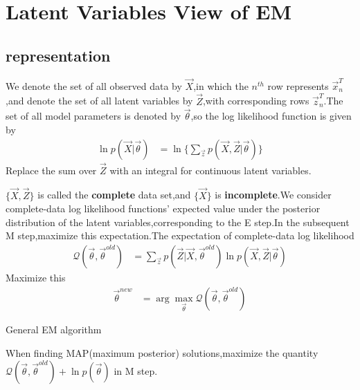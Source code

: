 \section{Latent Variables View of EM}
\subsection{representation}
We denote the set of all observed data by $\vec{X}$,in which the $n^{th}$ row represents $\vec{x}_n^T$,and denote the set of all latent variables by $\vec{Z}$,with corresponding rows $\vec{z}_n^T$.The set of all model parameters is denoted by $\vec{\theta}$,so the log likelihood function is given by
\begin{align}
\ln p(\vec{X}|\vec{\theta}) &=
\ln\{\sum_{\vec{z}}p(\vec{X},\vec{Z}|\vec{\theta}) \}
\end{align}
Replace the sum over $\vec{Z}$ with an integral for continuous latent variables.

$\{\vec{X},\vec{Z}\}$ is called the \textbf{complete} data set,and $\{\vec{X}\}$ is \textbf{incomplete}.We consider complete-data log likelihood functions' expected value under the posterior distribution of the latent variables,corresponding to the E step.In the subsequent M step,maximize this expectation.The expectation of complete-data log likelihood
\begin{align}
\mathcal{Q}(\vec{\theta},\vec{\theta}^{old}) &=
\sum_{\vec{z}}p(\vec{Z}|\vec{X},\vec{\theta}^{old})\ln p(\vec{X},\vec{Z}|\vec{\theta})
\end{align}
Maximize this
\begin{align}
\vec{\theta}^{new} &=\arg\max\limits_{\vec{\theta}}\mathcal{Q}(\vec{\theta},\vec{\theta}^{old})
\end{align}
\begin{algorithm}[H]
	\label{General EM algorithm}
	\caption{General EM algorithm}
	\DontPrintSemicolon
\end{algorithm}
When finding MAP(maximum posterior) solutions,maximize the quantity $\mathcal{Q}(\vec{\theta},\vec{\theta}^{old})+\ln p(\vec{\theta})$ in M step.

